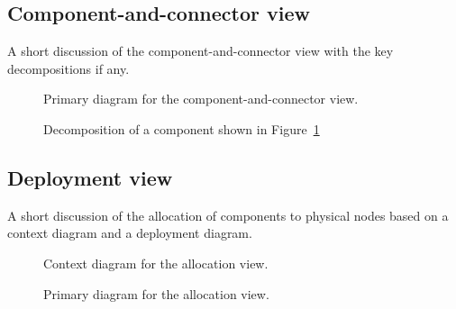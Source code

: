 \documentclass[a4paper,10pt]{article}
\begin{document}
\subsection{Component-and-connector view}
A short discussion of the component-and-connector view with the key
decompositions if any.

\begin{figure}[!htp]
    \centering
    \caption{Primary diagram for the component-and-connector view.
        }\label{fig:cc_main}
\end{figure}

\begin{figure}[!htp]
    \centering
    \caption{Decomposition of a component shown in Figure~\ref{fig:cc_main}
        }\label{fig:decomp_decomp1}
\end{figure}

\subsection{Deployment view}
A short discussion of the allocation of components to physical nodes based on a
context diagram and a deployment diagram.

\begin{figure}[!htp]
    \centering
    \caption{Context diagram for the allocation view.}\label{fig:depl_context}
\end{figure}

\begin{figure}[!htp]
    \centering
    \caption{Primary diagram for the allocation view.}\label{fig:depl_main}
\end{figure}
\end{document}
